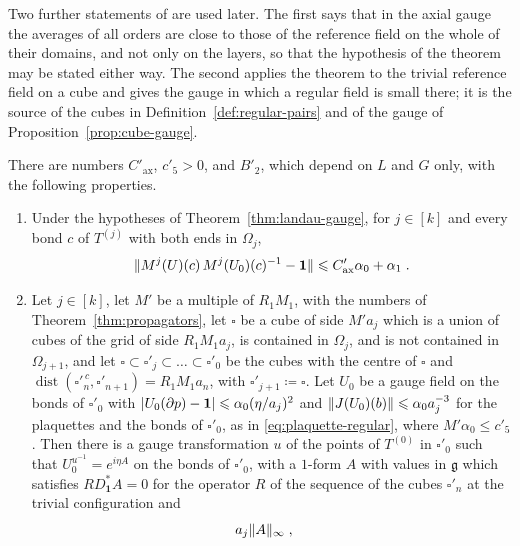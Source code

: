 \documentclass[11pt]{preprint}
\newcommand{\id}{\mathbf 1}
\newcommand{\dist}{\operatorname{dist}}
\DeclarePairedDelimiter{\abs}{\lvert}{\rvert}
\DeclarePairedDelimiter{\norm}{\lVert}{\rVert}
\numberwithin{equation}{section}
\begin{document}
Two further statements of \cite{BalabanREG} are used later. The first says that in the axial gauge the averages of all orders are close to those of the reference field on the whole of their domains, and not only on the layers, so that the hypothesis of the theorem may be stated either way. The second applies the theorem to the trivial reference field on a cube and gives the gauge in which a regular field is small there; it is the source of the cubes in Definition~\ref{def:regular-pairs} and of the gauge of Proposition~\ref{prop:cube-gauge}.

\begin{proposition}\label{prop:landau-variants}
There are numbers $C'_{\mathrm{ax}}$, $c'_5 > 0$, and $B'_2$, which depend on $L$ and $G$ only, with the following properties.
\begin{enumerate}[label=(\roman*)]
\item Under the hypotheses of Theorem~\ref{thm:landau-gauge}, for $j \in [k]$ and every bond $c$ of $T^{(j)}$ with both ends in $\Omega_j$,
\begin{equation}\label{eq:axial-averages}
    \norm{M^j(U)(c)\,M^j(U_0)(c)^{-1} - \id} \leqslant C'_{\mathrm{ax}}\alpha_0 + \alpha_1\;.
\end{equation}
\item Let $j \in [k]$, let $M'$ be a multiple of $R_1M_1$, with the numbers of Theorem~\ref{thm:propagators}, let $\square$ be a cube of side $M'a_j$ which is a union of cubes of the grid of side $R_1M_1a_j$, is contained in $\Omega_j$, and is not contained in $\Omega_{j+1}$, and let $\square \subset \square'_j \subset \dots \subset \square'_0$ be the cubes with the centre of $\square$ and $\dist(\square'^{\,c}_n, \square'_{n+1}) = R_1M_1a_n$, with $\square'_{j+1} \coloneqq \square$. Let $U_0$ be a gauge field on the bonds of $\square'_0$ with $\abs{U_0(\partial p) - \id} \leqslant \alpha_0(\eta/a_j)^2$ and $\norm{J(U_0)(b)} \leqslant \alpha_0a_j^{-3}$ for the plaquettes and the bonds of $\square'_0$, as in \eqref{eq:plaquette-regular}, where $M'\alpha_0 \leqslant c'_5$. Then there is a gauge transformation $u$ of the points of $T^{(0)}$ in $\square'_0$ such that $U_0^{u^{-1}} = e^{i\eta A}$ on the bonds of $\square'_0$, with a $1$-form $A$ with values in $\mathfrak g$ which satisfies $RD^*_{\id}A = 0$ for the operator $R$ of the sequence of the cubes $\square'_n$ at the trivial configuration and
\begin{equation}\label{eq:cube-landau}
    a_j\norm A_\infty\;,\quad

\end{equation}
\end{enumerate}
\end{proposition}
\end{document}
